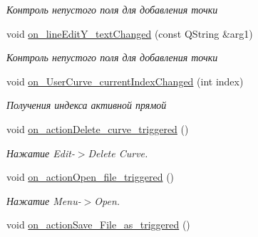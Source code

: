 \begin{DoxyCompactItemize}
\begin{DoxyCompactList}\small\item\em Контроль непустого поля для добавления точки \end{DoxyCompactList}\item 
void \hyperlink{class_main_window_a5f00712967779082bc1e5099f139c0c4}{on\+\_\+line\+Edit\+Y\+\_\+text\+Changed} (const Q\+String \&arg1)\hypertarget{class_main_window_a5f00712967779082bc1e5099f139c0c4}{}\label{class_main_window_a5f00712967779082bc1e5099f139c0c4}

\begin{DoxyCompactList}\small\item\em Контроль непустого поля для добавления точки \end{DoxyCompactList}\item 
void \hyperlink{class_main_window_abe5494f1256abd53569e546236078ead}{on\+\_\+\+User\+Curve\+\_\+current\+Index\+Changed} (int index)\hypertarget{class_main_window_abe5494f1256abd53569e546236078ead}{}\label{class_main_window_abe5494f1256abd53569e546236078ead}

\begin{DoxyCompactList}\small\item\em Получения индекса активной прямой \end{DoxyCompactList}\item 
void \hyperlink{class_main_window_a6107fba5e2e27b6234ebcf703cf305b1}{on\+\_\+action\+Delete\+\_\+curve\+\_\+triggered} ()\hypertarget{class_main_window_a6107fba5e2e27b6234ebcf703cf305b1}{}\label{class_main_window_a6107fba5e2e27b6234ebcf703cf305b1}

\begin{DoxyCompactList}\small\item\em Нажатие Edit-\/$>$Delete Curve. \end{DoxyCompactList}\item 
void \hyperlink{class_main_window_ab4b13cfa6d7b65dfdea897e7e8425874}{on\+\_\+action\+Open\+\_\+file\+\_\+triggered} ()\hypertarget{class_main_window_ab4b13cfa6d7b65dfdea897e7e8425874}{}\label{class_main_window_ab4b13cfa6d7b65dfdea897e7e8425874}

\begin{DoxyCompactList}\small\item\em Нажатие Menu-\/$>$Open. \end{DoxyCompactList}\item 
void \hyperlink{class_main_window_ad0e823ebb5284bffb3eb92f95d6b0c79}{on\+\_\+action\+Save\+\_\+\+File\+\_\+as\+\_\+triggered} ()\hypertarget{class_main_window_ad0e823ebb5284bffb3eb92f95d6b0c79}{}\label{class_main_window_ad0e823ebb5284bffb3eb92f95d6b0c79}


\end{DoxyCompactItemize}
